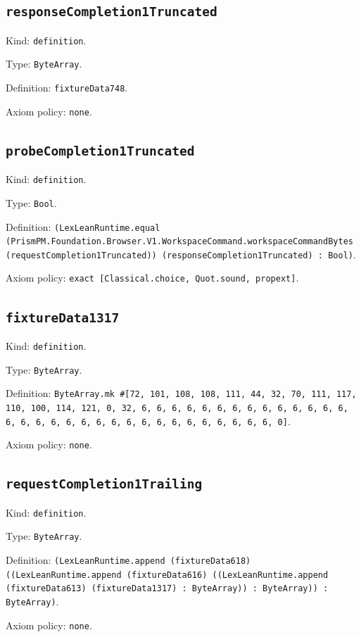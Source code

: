\documentclass[11pt]{article}
\begin{document}
\subsection*{\texttt{responseCompletion1Truncated}}
\noindent Kind: \texttt{definition}.\par
\noindent Type: \texttt{ByteArray}.\par
\noindent Definition: \texttt{fixtureData748}.\par
\noindent Axiom policy: \texttt{none}.\par
\subsection*{\texttt{probeCompletion1Truncated}}
\noindent Kind: \texttt{definition}.\par
\noindent Type: \texttt{Bool}.\par
\noindent Definition: \texttt{(LexLeanRuntime.equal (PrismPM.Foundation.Browser.V1.WorkspaceCommand.workspaceCommandBytes (requestCompletion1Truncated)) (responseCompletion1Truncated) : Bool)}.\par
\noindent Axiom policy: \texttt{exact [Classical.choice, Quot.sound, propext]}.\par
\subsection*{\texttt{fixtureData1317}}
\noindent Kind: \texttt{definition}.\par
\noindent Type: \texttt{ByteArray}.\par
\noindent Definition: \texttt{ByteArray.mk \#[72, 101, 108, 108, 111, 44, 32, 70, 111, 117, 110, 100, 114, 121, 0, 32, 6, 6, 6, 6, 6, 6, 6, 6, 6, 6, 6, 6, 6, 6, 6, 6, 6, 6, 6, 6, 6, 6, 6, 6, 6, 6, 6, 6, 6, 6, 6, 6, 0]}.\par
\noindent Axiom policy: \texttt{none}.\par
\subsection*{\texttt{requestCompletion1Trailing}}
\noindent Kind: \texttt{definition}.\par
\noindent Type: \texttt{ByteArray}.\par
\noindent Definition: \texttt{(LexLeanRuntime.append (fixtureData618) ((LexLeanRuntime.append (fixtureData616) ((LexLeanRuntime.append (fixtureData613) (fixtureData1317) : ByteArray)) : ByteArray)) : ByteArray)}.\par
\noindent Axiom policy: \texttt{none}.\par
\end{document}

